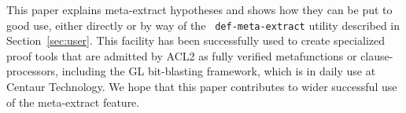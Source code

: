 \begin{comment}
[Old comment] One or both of us will write this.  Maybe we'll wait
  till a draft of the rest is written, so that we can hit the high
  points here.  Any ideas about future work?  Any lessons learned?
  (It would be cool if some application would likely have been much
  more difficult to carry out without this.)
\end{comment}

\begin{comment}
Is there a grep command we can run in books showing/ that we use
    meta-extract?  I tried

\begin{verbatim}
time fgrep --include='*.lisp' -ri meta-extract . | fgrep -v system/doc/acl2-doc.lisp
\end{verbatim}

\noindent but it includes things like {\tt
boundrw-ev-meta-extract-contextual-facts} and {\tt
ctx-ev-meta-extract-contextual-facts}, which I don't understand.

[Sol] These are macros for the universally-quantified hyps produced by
{\tt def-meta-extract}.  I think that's a good way to look for the
books that define metafunctions/clause-processors using meta-extract;
I did something like that to find examples for Section
\ref{sec:applications}.

Below is an initial stab at the conclusion by Matt, which undoubtedly
could be improved.  Maybe you can say a bit more, at a high level,
    about meta-extract at Centaur (even if only referring back to the
    applications section).
\end{comment}

This paper explains meta-extract hypotheses and shows how they can be
put to good use, either directly or by way of the {\tt
  def-meta-extract} utility described in Section~\ref{sec:user}.  This
facility has been successfully used to create specialized proof tools
that are admitted by ACL2 as fully verified metafunctions or
clause-processors, including the GL bit-blasting framework, which is
in daily use at Centaur Technology.  We hope that this paper
contributes to wider successful use of the meta-extract feature.
